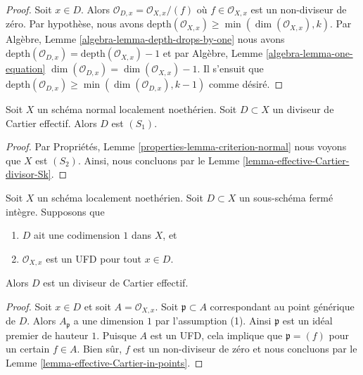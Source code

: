\begin{proof}
Soit  $x \in D$. Alors  $\mathcal{O}_{D, x} = \mathcal{O}_{X, x}/(f)$  où  $f \in \mathcal{O}_{X, x}$  est un non-diviseur de zéro.
Par hypothèse, nous avons  $\text{depth}(\mathcal{O}_{X, x}) \geq \min(\dim(\mathcal{O}_{X, x}), k)$. Par Algèbre, Lemme  \ref{algebra-lemma-depth-drops-by-one}  nous avons
 $\text{depth}(\mathcal{O}_{D, x}) = \text{depth}(\mathcal{O}_{X, x}) - 1$  et par Algèbre, Lemme  \ref{algebra-lemma-one-equation}   $\dim(\mathcal{O}_{D, x}) = \dim(\mathcal{O}_{X, x}) - 1$. Il s'ensuit que
 $\text{depth}(\mathcal{O}_{D, x}) \geq \min(\dim(\mathcal{O}_{D, x}), k - 1)$  comme désiré.
\end{proof}

\begin{lemma}
\label{lemma-normal-effective-Cartier-divisor-S1}
Soit  $X$  un schéma normal localement noethérien. Soit  $D \subset X$  un
diviseur de Cartier effectif. Alors  $D$  est  $(S_1)$.
\end{lemma}

\begin{proof}
Par Propriétés, Lemme  \ref{properties-lemma-criterion-normal}  nous voyons que  $X$  est  $(S_2)$.
Ainsi, nous concluons par le Lemme  \ref{lemma-effective-Cartier-divisor-Sk}.
\end{proof}

\begin{lemma}
\label{lemma-weil-divisor-is-cartier-UFD}
Soit  $X$  un schéma localement noethérien. Soit  $D \subset X$  un
sous-schéma fermé intègre. Supposons que
\begin{enumerate}
\item $D$  ait une codimension  $1$  dans  $X$, et
\item $\mathcal{O}_{X, x}$  est un UFD pour tout  $x \in D$.
\end{enumerate}
Alors  $D$  est un diviseur de Cartier effectif.
\end{lemma}

\begin{proof}
Soit  $x \in D$  et soit  $A = \mathcal{O}_{X, x}$. Soit  $\mathfrak p \subset A$  correspondant au point
générique de  $D$. Alors  $A_\mathfrak p$  a une dimension  $1$  par
l'assumption (1). Ainsi  $\mathfrak p$  est un idéal premier de hauteur  $1$.
Puisque  $A$  est un UFD, cela implique que  $\mathfrak p = (f)$  pour un certain
 $f \in A$. Bien sûr,  $f$  est un non-diviseur de zéro et nous concluons
par le Lemme  \ref{lemma-effective-Cartier-in-points}.
\end{proof}

